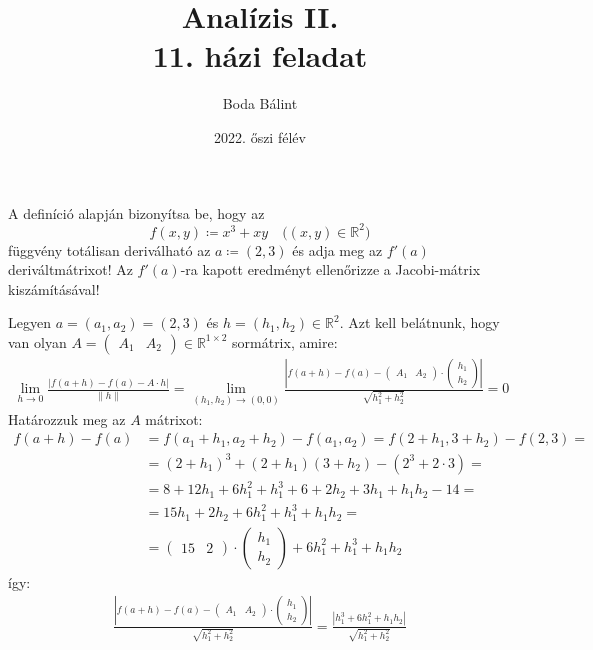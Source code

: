 \documentclass[a4paper,12pt]{article}
\title{\huge{Analízis II.} \\[-4pt] \large 11. házi feladat \vspace{-15pt}}
\author{Boda Bálint}
\date{\vspace{-12pt}2022. őszi félév}
\begin{document}
    \maketitle
    \vspace{-10pt}
\begin{question}
	A definíció alapján bizonyítsa be, hogy az 
	\[
		f(x,y) \coloneq x^3+xy \quad \bigl( (x,y) \in \mathbb{R}^2 \bigr)
	\]
	függvény totálisan deriválható az $a \coloneq (2,3) $ és adja meg  az $f'(a)$ deriváltmátrixot! Az $f'(a)$-ra kapott eredményt ellenőrizze a Jacobi-mátrix kiszámításával!
\end{question}
\begin{solution}
	Legyen $ a = (a_1,a_2) = (2,3) $ és $ h = (h_1,h_2) \in \mathbb{R}^2 $. Azt kell belátnunk, hogy van olyan ${ A = \begin{pmatrix} A_1 & A_2 \end{pmatrix} \in \mathbb{R}^{1 \times 2}}$ sormátrix, amire:
	\begin{align*}
		\lim_{h \rightarrow 0}{\frac{\left|  f(a+h) - f(a) - A \cdot h\right|}{\lVert h \rVert}} =
		\lim_{(h_1,h_2) \rightarrow (0,0)}{\frac{ \left| f(a+h) - f(a) - \begin{pmatrix} A_1 & A_2 \end{pmatrix} \cdot \begin{pmatrix} h_1 \\ h_2 \end{pmatrix} \right| }{\sqrt{h_1^2 + h_2^2}}} = 0
	\end{align*}
	Határozzuk meg az $A$ mátrixot:
	\begin{align*}
		f(a+h) - f(a) &= f(a_1+h_1,a_2+h_2) - f(a_1,a_2) = f(2+h_1,3+h_2) - f(2,3) = \\
		&= (2+h_1)^3 + (2+h_1)(3+h_2) - (2^3 + 2 \cdot 3 ) = \\
		&= 8 + 12h_1 + 6h_1^2 + h_1^3 + 6 + 2h_2 + 3h_1 + h_1h_2 - 14 = \\
		&= 15h_1 + 2h_2 + 6h_1^2 + h_1^3 + h_1h_2 = \\
		&= \begin{pmatrix} 15 & 2 \end{pmatrix} \cdot \begin{pmatrix} h_1 \\ h_2 \end{pmatrix} + 6h_1^2 + h_1^3 + h_1h_2 
	\end{align*}
	így:
	\begin{align*}
		\frac{ \left| f(a+h) - f(a) - \begin{pmatrix} A_1 & A_2 \end{pmatrix} \cdot \begin{pmatrix} h_1 \\ h_2 \end{pmatrix} \right| }{\sqrt{h_1^2 + h_2^2}} = \frac{ \left| h_1^3 + 6h_1^2 + h_1h_2 \right| }{\sqrt{h_1^2 + h_2^2}}

\end{align*}
\end{solution}
\end{document}
